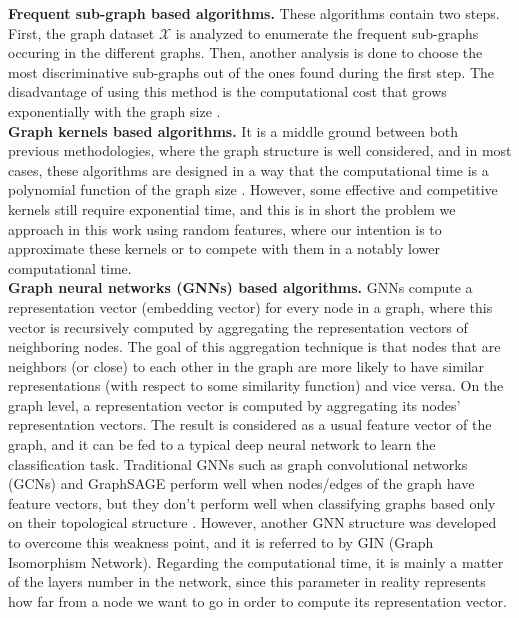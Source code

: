 \noindent\textbf{Frequent sub-graph based algorithms.} These algorithms contain two steps. First, the graph dataset $\mathcal{X}$ is analyzed to enumerate the frequent sub-graphs occuring in the different graphs. Then, another analysis is done to choose the most discriminative sub-graphs out of the ones found during the first step. The disadvantage of using this method is the computational cost that grows exponentially with the graph size \citep{graphlet_kernel}. \\

\noindent\textbf{Graph kernels based algorithms.} It is a middle ground between both previous methodologies, where the graph structure is well considered, and in most cases, these algorithms are designed in a way that the computational time is a polynomial function of the graph size \citep{graphlet_kernel}. However, some effective and competitive kernels still require exponential time, and this is in short the problem we approach in this work using random features, where our intention is to approximate these kernels or to compete with them in a notably lower computational time. \\

\noindent\textbf{Graph neural networks (GNNs) based algorithms.} GNNs compute a representation vector (embedding vector) for every node in a graph, where this vector is recursively computed by aggregating the representation vectors of neighboring nodes. The goal of this aggregation technique is that nodes that are neighbors (or close) to each other in the graph are more likely to have similar representations (with respect to some similarity function) and vice versa. On the graph level, a representation vector is computed by aggregating its nodes' representation vectors. The result is considered as a usual feature vector of the graph, and it can be fed to a typical deep neural network to learn the classification task. Traditional GNNs such as graph convolutional networks (GCNs) and GraphSAGE perform well when nodes/edges of the graph have feature vectors, but they don't perform well when classifying graphs based only on their topological structure \citep{GCN_powerful}.
However, another GNN structure was developed to overcome this weakness point, and it is referred to by GIN (Graph Isomorphism Network). Regarding the computational time, it is mainly a matter of the layers number in the network, since this parameter in reality represents how far from a node we want to go in order to compute its representation vector. 

